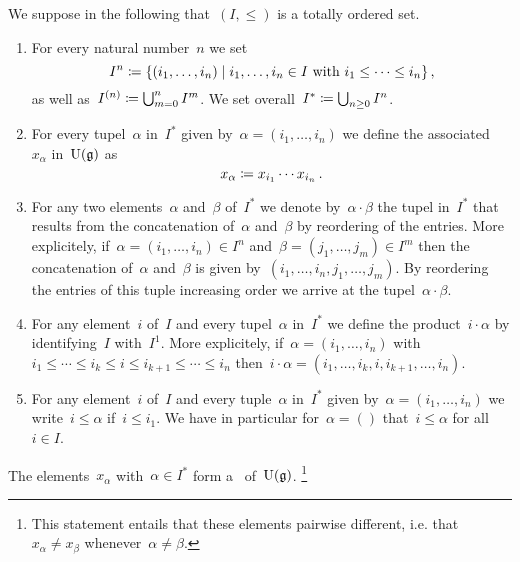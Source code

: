 \begin{convention}
  We suppose in the following that~$(I, \leq)$ is a totally ordered set.
  \begin{enumerate}
    \item
      For every natural number~$n$ we set
      \[
        I^n
        \defined
        \{
          (i_1, \dotsc, i_n)
        \suchthat
          \text{$i_1, \dotsc, i_n \in I$ with~$i_1 \leq \dotsb \leq i_n$}
        \} \,,
      \]
      as well as~$I^{(n)} \coloneqq \bigcup_{m=0}^n I^m$.
      We set overall~$I^* \coloneqq \bigcup_{n \geq 0} I^n$.
    \item
      For every tupel~$\alpha$ in~$I^*$ given by~$\alpha = (i_1, \dotsc, i_n)$ we define the associated ~$x_\alpha$ in~$\operatorname{U}(\mathfrak{g})$ as
      \[
        x_\alpha
        \coloneqq
        x_{i_1} \dotsm x_{i_n}  \,.
      \]
    \item  
      For any two elements~$\alpha$ and~$\beta$ of~$I^*$ we denote by~$\alpha \cdot \beta$ the tupel in~$I^*$ that results from the concatenation of~$\alpha$ and~$\beta$ by reordering of the entries.
      More explicitely, if~$\alpha = (i_1, \dotsc, i_n) \in I^n$ and~$\beta = (j_1, \dotsc, j_m) \in I^m$ then the concatenation of~$\alpha$ and~$\beta$ is given by~$(i_1, \dotsc, i_n, j_1, \dotsc, j_m)$.
      By reordering the entries of this tuple increasing order we arrive at the tupel~$\alpha \cdot \beta$.
    \item
      For any element~$i$ of~$I$ and every tupel~$\alpha$ in~$I^*$ we define the product~$i \cdot \alpha$ by identifying~$I$ with~$I^1$.
      More explicitely, if~$\alpha = (i_1, \dotsc, i_n)$ with~$i_1 \leq \dotsb \leq i_k \leq i \leq i_{k+1} \leq \dotsb \leq i_n$ then~$i \cdot \alpha = (i_1, \dotsc, i_k, i, i_{k+1}, \dotsc, i_n)$.
    \item
      For any element~$i$ of~$I$ and every tuple~$\alpha$ in~$I^*$ given by~$\alpha = (i_1, \dotsc, i_n)$ we write~$i \leq \alpha$ if~$i \leq i_1$.
      We have in particular for~$\alpha = ()$ that~$i \leq \alpha$ for all~$i \in I$.
  \end{enumerate}
\end{convention}


\begin{theorem}
  \label{pbw concrete}
  The elements~$x_\alpha$ with~$\alpha \in I^*$ form a~{\basis{$\kf$}} of~$\operatorname{U}(\mathfrak{g})$.%
  \footnote{This statement entails that these elements pairwise different, i.e. that~$x_\alpha \neq x_\beta$ whenever~$\alpha \neq \beta$.}
\end{theorem}


